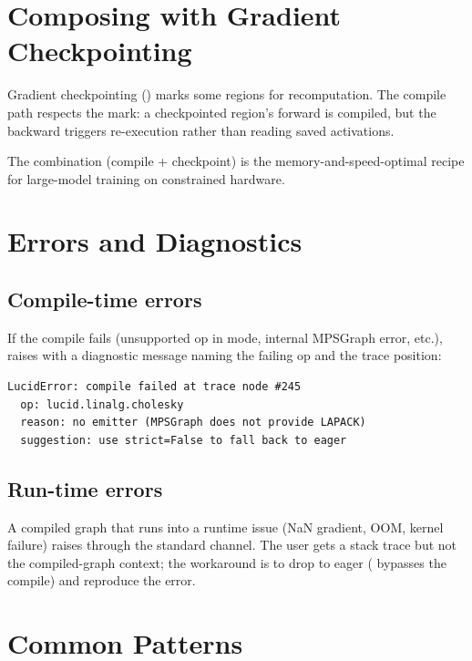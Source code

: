\section{Composing with Gradient Checkpointing}
\label{sec:compiled_module:composing_checkpoint}

Gradient checkpointing () marks
some regions for recomputation. The compile path respects the
mark: a checkpointed region's forward is compiled, but the
backward triggers re-execution rather than reading saved
activations.

The combination (compile + checkpoint) is the
memory-and-speed-optimal recipe for large-model training on
constrained hardware.

\section{Errors and Diagnostics}
\label{sec:compiled_module:errors}

\subsection{Compile-time errors}
\label{ssec:compiled_module:compile_errors}

If the compile fails (unsupported op in  mode,
internal MPSGraph error, etc.),  raises
with a diagnostic message naming the failing op and the trace
position:

\begin{verbatim}
LucidError: compile failed at trace node #245
  op: lucid.linalg.cholesky
  reason: no emitter (MPSGraph does not provide LAPACK)
  suggestion: use strict=False to fall back to eager
\end{verbatim}

\subsection{Run-time errors}
\label{ssec:compiled_module:runtime_errors}

A compiled graph that runs into a runtime issue (NaN gradient,
OOM, kernel failure) raises through the standard
 channel. The user gets a stack trace but not
the compiled-graph context; the workaround is to drop to eager
( bypasses the compile) and reproduce the error.

\section{Common Patterns}
\label{sec:compiled_module:patterns}

